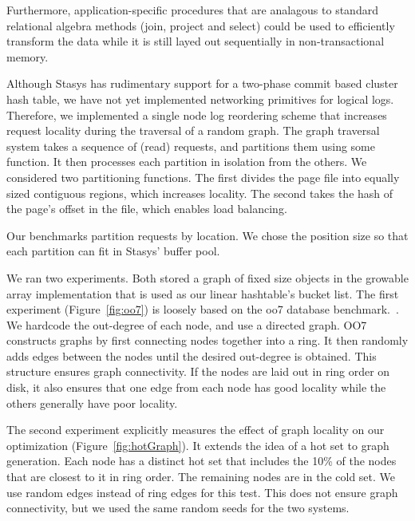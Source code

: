 \documentclass[letterpaper,twocolumn,10pt]{article}
\newcommand{\yad}{Stasys\xspace}
\newcommand{\yads}{Stasys'\xspace}
\begin{document}
Furthermore, application-specific
procedures that are analagous to standard relational algebra methods
(join, project and select) could be used to efficiently transform the data
while it is still layed out sequentially
in non-transactional memory.


Although \yad has rudimentary support for a two-phase commit based
cluster hash table, we have not yet implemented networking primitives for logical logs.
Therefore, we implemented a single node log reordering scheme that increases request locality
during the traversal of a random graph.  The graph traversal system
takes a sequence of (read) requests, and partitions them using some
function.  It then processes each partition in isolation from the
others.  We considered two partitioning functions.  The first divides the page file
into equally sized contiguous regions, which increases locality.  The second takes the hash
of the page's offset in the file, which enables load balancing.

Our benchmarks partition requests by location.  We chose the
position size so that each partition can fit in \yads buffer pool.

We ran two experiments.  Both stored a graph of fixed size objects in
the growable array implementation that is used as our linear
hashtable's bucket list.
The first experiment (Figure~\ref{fig:oo7})
is loosely based on the oo7 database benchmark.~\cite{oo7}.  We
hardcode the out-degree of each node, and use a directed graph.  OO7
constructs graphs by first connecting nodes together into a ring.
It then randomly adds edges between the nodes until the desired
out-degree is obtained.  This structure ensures graph connectivity.
If the nodes are laid out in ring order on disk, it also ensures that
one edge from each node has good locality while the others generally
have poor locality.

The second experiment explicitly measures the effect of graph locality
on our optimization (Figure~\ref{fig:hotGraph}). It extends the idea
of a hot set to graph generation.  Each node has a distinct hot set
that includes the 10\% of the nodes that are closest to it in ring
order.  The remaining nodes are in the cold set.  We use random edges
instead of ring edges for this test.  This does not ensure graph
connectivity, but we used the same random seeds for the two systems.
\end{document}
